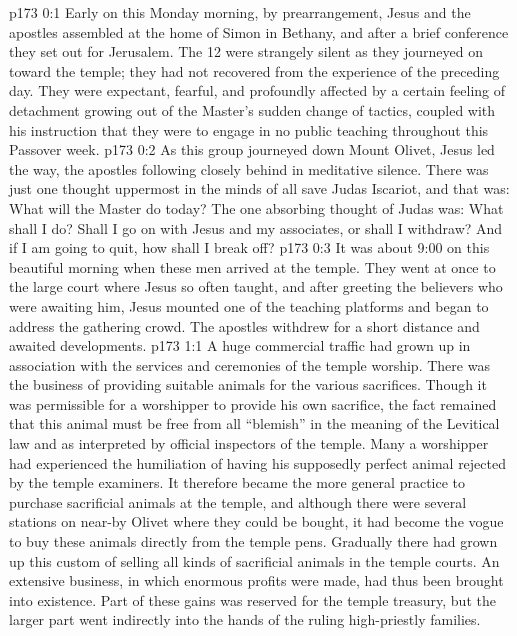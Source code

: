 \author{Midwayer Commission}
\vs p173 0:1 Early on this Monday morning, by prearrangement, Jesus and the apostles assembled at the home of Simon in Bethany, and after a brief conference they set out for Jerusalem. The 12 were strangely silent as they journeyed on toward the temple; they had not recovered from the experience of the preceding day. They were expectant, fearful, and profoundly affected by a certain feeling of detachment growing out of the Master’s sudden change of tactics, coupled with his instruction that they were to engage in no public teaching throughout this Passover week.
\vs p173 0:2 As this group journeyed down Mount Olivet, Jesus led the way, the apostles following closely behind in meditative silence. There was just one thought uppermost in the minds of all save Judas Iscariot, and that was: What will the Master do today? The one absorbing thought of Judas was: What shall I do? Shall I go on with Jesus and my associates, or shall I withdraw? And if I am going to quit, how shall I break off?
\vs p173 0:3 It was about 9:00 on this beautiful morning when these men arrived at the temple. They went at once to the large court where Jesus so often taught, and after greeting the believers who were awaiting him, Jesus mounted one of the teaching platforms and began to address the gathering crowd. The apostles withdrew for a short distance and awaited developments.
\vs p173 1:1 A huge commercial traffic had grown up in association with the services and ceremonies of the temple worship. There was the business of providing suitable animals for the various sacrifices. Though it was permissible for a worshipper to provide his own sacrifice, the fact remained that this animal must be free from all “blemish” in the meaning of the Levitical law and as interpreted by official inspectors of the temple. Many a worshipper had experienced the humiliation of having his supposedly perfect animal rejected by the temple examiners. It therefore became the more general practice to purchase sacrificial animals at the temple, and although there were several stations on near\hyp{}by Olivet where they could be bought, it had become the vogue to buy these animals directly from the temple pens. Gradually there had grown up this custom of selling all kinds of sacrificial animals in the temple courts. An extensive business, in which enormous profits were made, had thus been brought into existence. Part of these gains was reserved for the temple treasury, but the larger part went indirectly into the hands of the ruling high\hyp{}priestly families.
